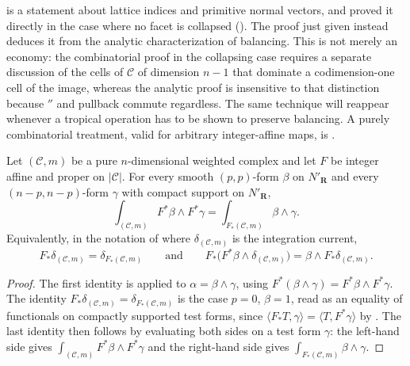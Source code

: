 \begin{remark}
\label{rem:ch11-pushforward-proof-style}
 is a statement about lattice indices and
primitive normal vectors, and  proved it directly
in the case where no facet is collapsed
().  The proof just given instead
deduces it from the analytic characterization of balancing.  This is not
merely an economy: the combinatorial proof in the collapsing case requires a
separate discussion of the cells of $\mathscr C$ of dimension $n-1$ that
dominate a codimension-one cell of the image, whereas the analytic proof is
insensitive to that distinction because $\dprime$ and pullback commute
regardless.  The same technique will reappear whenever a tropical operation
has to be shown to preserve balancing.  A purely combinatorial treatment,
valid for arbitrary integer-affine maps, is
\cite[\S4.6]{MR18Tropical}.
\end{remark}

\begin{corollary}
\label{cor:ch11-projection-formula}
Let $(\mathscr C,m)$ be a pure $n$-dimensional weighted complex and let $F$
be integer affine and proper on $|\mathscr C|$.  For every smooth
$(p,p)$-form $\beta$ on $N'_{\mathbf R}$ and every $(n-p,n-p)$-form
$\gamma$ with compact support on $N'_{\mathbf R}$,
\[
 \int_{(\mathscr C,m)}F^*\beta\wedge F^*\gamma
 =\int_{F_*(\mathscr C,m)}\beta\wedge\gamma .
\]
Equivalently, in the notation of  where
$\delta_{(\mathscr C,m)}$ is the integration current,
\[
 F_*\delta_{(\mathscr C,m)}=\delta_{F_*(\mathscr C,m)}
 \qquad\text{and}\qquad
 F_*\bigl(F^*\beta\wedge\delta_{(\mathscr C,m)}\bigr)
 =\beta\wedge F_*\delta_{(\mathscr C,m)} .
\]
\end{corollary}

\begin{proof}
The first identity is  applied to
$\alpha=\beta\wedge\gamma$, using $F^*(\beta\wedge\gamma)
=F^*\beta\wedge F^*\gamma$.  The identity
$F_*\delta_{(\mathscr C,m)}=\delta_{F_*(\mathscr C,m)}$ is the case $p=0$,
$\beta=1$, read as an equality of functionals on compactly supported test
forms, since $\langle F_*T,\gamma\rangle=\langle T,F^*\gamma\rangle$ by
.  The last identity then follows by
evaluating both sides on a test form $\gamma$: the left-hand side gives
$\int_{(\mathscr C,m)}F^*\beta\wedge F^*\gamma$ and the right-hand side
gives $\int_{F_*(\mathscr C,m)}\beta\wedge\gamma$.
\end{proof}


